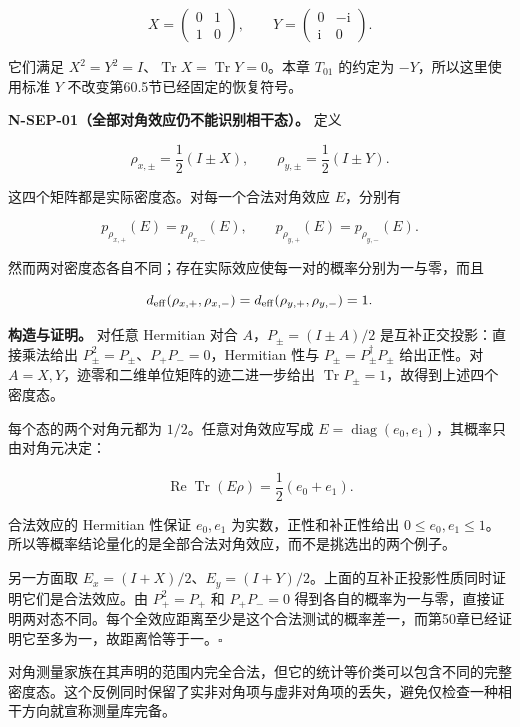 \documentclass[
  11pt,
  oneside]{book}
\begin{document}
\[
X=\begin{pmatrix}0&1\\1&0\end{pmatrix},\qquad
Y=\begin{pmatrix}0&-\mathrm i\\\mathrm i&0\end{pmatrix}.
\]

它们满足
\(X^2=Y^2=I\)、\(\operatorname{Tr}X=\operatorname{Tr}Y=0\)。本章
\(T_{01}\) 的约定为 \(-Y\)，所以这里使用标准 \(Y\)
不改变第60.5节已经固定的恢复符号。

\protect\hypertarget{n-sep-01}{}{}

\textbf{N-SEP-01（全部对角效应仍不能识别相干态）。} 定义

\[
\rho_{x,\pm}=\frac12(I\pm X),\qquad
\rho_{y,\pm}=\frac12(I\pm Y).
\]

这四个矩阵都是实际密度态。对每一个合法对角效应 \(E\)，分别有

\[
p_{\rho_{x,+}}(E)=p_{\rho_{x,-}}(E),\qquad
p_{\rho_{y,+}}(E)=p_{\rho_{y,-}}(E).
\]

然而两对密度态各自不同；存在实际效应使每一对的概率分别为一与零，而且

\[
d_{\rm eff}(\rho_{x,+},\rho_{x,-})
=d_{\rm eff}(\rho_{y,+},\rho_{y,-})=1.
\]

\textbf{构造与证明。} 对任意 Hermitian 对合 \(A\)，\(P_\pm=(I\pm A)/2\)
是互补正交投影：直接乘法给出 \(P_\pm^2=P_\pm\)、\(P_+P_-=0\)，Hermitian
性与 \(P_\pm=P_\pm^\dagger P_\pm\) 给出正性。对
\(A=X,Y\)，迹零和二维单位矩阵的迹二进一步给出
\(\operatorname{Tr}P_\pm=1\)，故得到上述四个密度态。

每个态的两个对角元都为 \(1/2\)。任意对角效应写成
\(E=\operatorname{diag}(e_0,e_1)\)，其概率只由对角元决定：

\[
\operatorname{Re}\operatorname{Tr}(E\rho)
=\frac12(e_0+e_1).
\]

合法效应的 Hermitian 性保证 \(e_0,e_1\) 为实数，正性和补正性给出
\(0\le e_0,e_1\le1\)。所以等概率结论量化的是全部合法对角效应，而不是挑选出的两个例子。

另一方面取
\(E_x=(I+X)/2\)、\(E_y=(I+Y)/2\)。上面的互补正投影性质同时证明它们是合法效应。由
\(P_+^2=P_+\) 和 \(P_+P_-=0\)
得到各自的概率为一与零，直接证明两对态不同。每个全效应距离至少是这个合法测试的概率差一，而第50章已经证明它至多为一，故距离恰等于一。\(\square\)

对角测量家族在其声明的范围内完全合法，但它的统计等价类可以包含不同的完整密度态。这个反例同时保留了实非对角项与虚非对角项的丢失，避免仅检查一种相干方向就宣称测量库完备。
\end{document}
